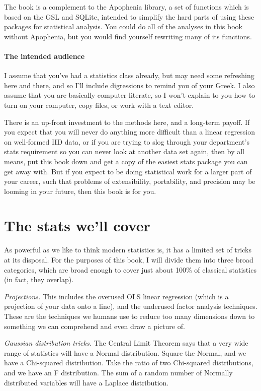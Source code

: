 \documentclass[12pt,notitlepage, openany]{book}
\def\ind#1{\index{#1}#1}
\begin{document}
The book is a complement to the \ind{Apophenia} library, a set of functions which
is based on the GSL and SQLite, intended to simplify the hard parts of
using these packages for statistical analysis. You could do all of the
analyses in this book without Apophenia, but you would find yourself
rewriting many of its functions.

\paragraph{The intended audience}
I assume that you've had a statistics class already, but may need some refreshing
here and there, and so I'll include digressions to remind you of your Greek. I also
assume that you are basically computer-literate, so I won't explain to you how to
turn on your computer, copy files, or work with a text editor.

There is an up-front investment to the methods here, and a long-term
payoff. If you expect that you will never do
anything more difficult than a linear regression on well-formed IID data,
or if you are trying to slog through your department's stats requirement
so you can never look at another data set again, then by all means, put
this book down and get a copy of the easiest stats package you can get
away with. But if you expect to be doing statistical work for a larger
part of your career, such that problems of extensibility, portability,
and precision may be looming in your future, then this book is for you.

\section{The stats we'll cover} 
As powerful as we like to think modern statistics is, it has a 
limited set of tricks at its disposal. For the purposes of this book,
I will divide them into three broad categories, which are broad enough
to cover just about 100\% of classical statistics (in fact, they overlap).

{\it Projections.} This includes the overused OLS linear regression (which is
a projection of your data onto a line), and the underused factor analysis
techniques. These are the techniques we humans use to reduce too many
dimensions down to something we can comprehend and even draw a picture of.

{\it Gaussian distribution tricks.} The Central Limit Theorem says that
a very wide range of statistics will have a Normal distribution. Square
the Normal, and we have a Chi-squared distribution. Take the ratio of two
Chi-squared distributions, and we have an F distribution.  The sum of
a random number of Normally distributed variables will have a Laplace
distribution.
\end{document}
